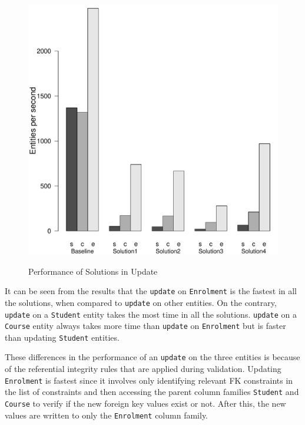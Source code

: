 \begin{figure}[H]
		{\includegraphics[width=\Width]{figure/result/barplot-update-tp.pdf}\label{fres:Update-throughput}}
		\caption{Performance of Solutions in Update}\label{fres:Update}
	\end{figure}
 
It can be seen from the results that the
\texttt{update} on \texttt{Enrolment} is the fastest in all the solutions, when
compared to \texttt{update} on other entities. On the contrary, \texttt{update}
on a \texttt{Student} entity takes the most time in all the solutions.
\texttt{update} on a \texttt{Course} entity always takes more time than
\texttt{update} on \texttt{Enrolment} but is faster than updating
\texttt{Student} entities.

These differences in the performance of an \texttt{update} on the three entities
is because of the referential integrity rules that are applied during
validation.
Updating \texttt{Enrolment} is fastest since it involves only identifying
relevant \ac{FK} constraints in the list of constraints and then accessing the
parent column families \texttt{Student} and \texttt{Course} to verify if the new
foreign key values exist or not. After this, the new values are written to only
the \texttt{Enrolment} column family. 

